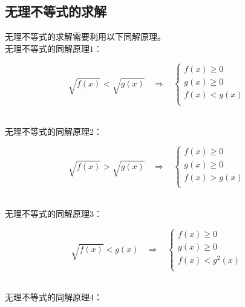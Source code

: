 \documentclass[UTF8]{ctexart}
\begin{document}
\subsection{无理不等式的求解}
    无理不等式的求解需要利用以下同解原理。\\[3mm]
    无理不等式的同解原理$1$：
    \begin{large}
        \begin{equation*}
            \sqrt{f(x)}<\sqrt{g(x)}~~~~\Rightarrow~~~~
            \begin{cases}
                f(x)\geq 0\\[1mm]
                g(x)\geq 0\\[1mm]
                f(x)<g(x)\\[1mm]
            \end{cases}
        \end{equation*}
    \end{large}\\
    无理不等式的同解原理$2$：
    \begin{large}
        \begin{equation*}
            \sqrt{f(x)}>\sqrt{g(x)}~~~~\Rightarrow~~~~
            \begin{cases}
                f(x)\geq 0\\[1mm]
                g(x)\geq 0\\[1mm]
                f(x)>g(x)\\[1mm]
            \end{cases}
        \end{equation*}
    \end{large}\\
    无理不等式的同解原理$3$：
    \begin{large}
        \begin{equation*}
            \sqrt{f(x)}<g(x)~~~~\Rightarrow~~~~
            \begin{cases}
                f(x)\geq 0\\[1mm]
                g(x)\geq 0\\[1mm]
                f(x)<g^2(x)\\[1mm]
            \end{cases}
        \end{equation*}
    \end{large}\\
    无理不等式的同解原理$4$：
\end{document}
